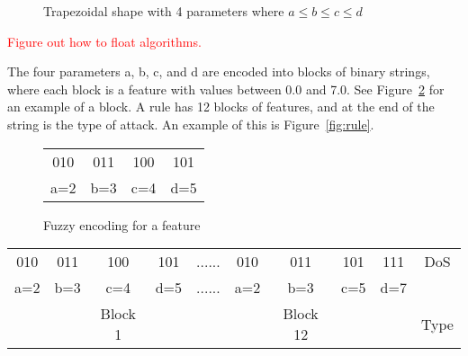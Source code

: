 \documentclass{sig-alternate}
\newcommand{\mycomment}[1]{\textcolor{red}{#1}}
\begin{document}
\begin{figure}
\centering
{}
\caption{Trapezoidal shape with 4 parameters where $a\leq b\leq c\leq d$}
\label{fig:trapFigure}
\end{figure}

\mycomment{Figure out how to float algorithms.}
\begin{algorithm}
\caption{Fuzzy Algorithm}
\label{alg:fuzAlg}
\begin{algorithmic}
\ELSE {}
\ENDIF
\end{algorithmic}
\end{algorithm}

The four parameters a, b, c, and d are encoded into blocks of binary strings, where each block is a feature with values between 0.0 and 7.0. See Figure~\ref{fig:fuzEncodingForFeature} for an example of a block. A rule has 12 blocks of features, and at the end of the string is the type of attack. An example of this is Figure~\ref{fig:rule}.

\begin{figure}
\centering
\caption{Fuzzy encoding for a feature}
\begin{tabular}{|cccc|} \hline
010 & 011 & 100 & 101\\
a=2 & b=3 & c=4 & d=5\\
\hline\end{tabular}
\label{fig:fuzEncodingForFeature}
\end{figure}

\begin{figure*}
\centering
\caption{A rule with 12 blocks of features}
\begin{tabular}{|cccc|c|cccc|c|} \hline
010 & 011 & 100 & 101   & ...... & 010 & 011 & 101 & 111   & DoS\\
a=2 & b=3 & c=4 & d=5   & ...... & a=2 & b=3 & c=5 & d=7   &\\ 
    &     & Block 1&    &        &     & Block 12& &       & Type\\
\hline\end{tabular}
\label{fig:rule}
\end{figure*}
\end{document}
